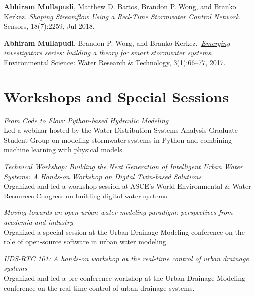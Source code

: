 \documentclass[a4paper,11pt]{article}
\newcommand{\years}[1]{%
  {\reversemarginpar\strut\marginnote{{\small#1}}}%
}
\begin{document}
\years{2018} \textbf{Abhiram Mullapudi}, Matthew D. Bartos, Brandon P. Wong, and Branko Kerkez.
\href{https://randomstorms.net/data/papers/shapingwater.pdf}{\emph{Shaping Streamflow Using a Real-Time Stormwater Control Network}}. Sensors, 18(7):2259, Jul 2018.\\[.1cm]


\years{2017} \textbf{Abhiram Mullapudi}, Brandon P. Wong, and Branko Kerkez.\ \href{https://randomstorms.net/data/papers/stormwatertheory.pdf}{\emph{Emerging investigators series: building a theory for smart stormwater systems}}. Environmental Science: Water Research \& Technology, 3(1):66–77, 2017.

\section*{Workshops and Special Sessions}
\years{2024} \emph{From Code to Flow: Python-based Hydraulic Modeling}\\[0.2cm]
Led a webinar hosted by the Water Distribution Systems Analysis Graduate Student Group on modeling stormwater systems in Python and combining machine learning with physical models.\\[.1cm]

\years{2023} \emph{Technical Workshop: Building the Next Generation of Intelligent Urban Water
Systems: A Hands-on Workshop on Digital Twin-based Solutions}\\[0.2cm]
Organized and led a workshop session at ASCE's World Environmental \& Water Resources Congress on building
digital water systems.\\[.1cm]

\years{2022} \emph{Moving towards an open urban water modeling paradigm: perspectives from academia and industry}\\[.2cm]
Organized a special session at the Urban Drainage Modeling conference on the
role of open-source software in urban water modeling.\\[.1cm]

\years{2022} \emph{UDS-RTC 101: A hands-on workshop on the real-time control of urban drainage systems}\\[.2cm]
Organized and led a pre-conference workshop at the Urban Drainage Modeling
conference on the real-time control of urban drainage systems.\\[.1cm]
\end{document}
